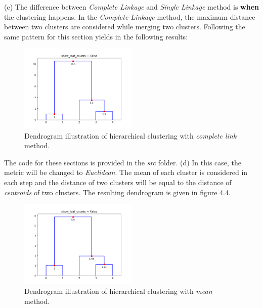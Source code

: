 \documentclass[12pt]{article}
\numberwithin{equation}{section}
\numberwithin{table}{section}
\numberwithin{figure}{section}
\begin{document}
(c) The difference between \textit{Complete Linkage} and \textit{Single Linkage} method is \textbf{when} the clustering happens. In the \textit{Complete Linkage} method, the maximum distance between two clusters are considered while merging two clusters. Following the same pattern for this section yields in the following results:
\begin{figure}[!h]\centering
	\includegraphics[width=0.5\textwidth]{dendro3.PNG}
	\caption{Dendrogram illustration of hierarchical clustering with \textit{complete link} method.}
	\label{pl1}
\end{figure}
The code for these sections is provided in the \textit{src} folder.
(d) In this case, the metric will be changed to \textit{Euclidean}. The mean of each cluster is considered in each step and the distance of two clusters will be equal to the distance of \textit{centroids} of two clusters. The resulting dendrogram is given in figure 4.4.
\begin{figure}[!h]\centering
	\includegraphics[width=0.5\textwidth]{dendro4.PNG}
	\caption{Dendrogram illustration of hierarchical clustering with \textit{mean} method.}
	\label{pl1}
\end{figure}
\end{document}
